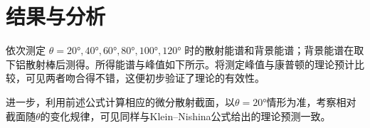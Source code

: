 \documentclass[aps,pre,12pt,preprint,%
	onecolumn,showpacs,showkeys,nofootinbib]{revtex4-1}
\begin{document}
\section{结果与分析}
%
%
	依次测定
	$\theta
		= \ang{20},\ang{40},\ang{60},
		\ang{80},\ang{100},\ang{120}$
	时的散射能谱和背景能谱；背景能谱在取下铝散射棒后测得。所得能谱与峰值如下所示。将测定峰值与康普顿的理论预计比较，可见两者吻合得不错，这便初步验证了理论的有效性。
	
	进一步，利用前述公式计算相应的微分散射截面，以$\theta = \ang{20}$情形为准，考察相对截面随$\theta$的变化规律，可见同样与Klein--Nishina公式给出的理论预测一致。
	
\end{document}

